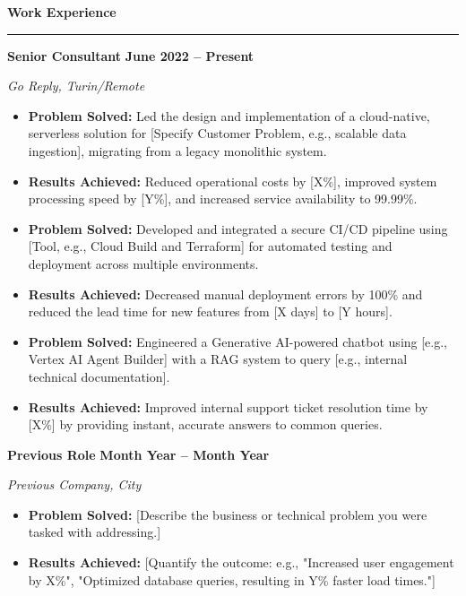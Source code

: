 \documentclass[9pt, a4paper]{article}
\newcommand{\cvsection}[1]{%
  \vspace{8pt} %
  \par %
  {\Large\bfseries\color{sectionblue}#1} %
  \par %
  \vspace{2pt} %
  \hrule %
  \vspace{6pt} %
}
\newcommand{\cvsubsection}[3]{%
  \par %
  {\large\bfseries #1} %
  \hfill %
  {\bfseries #2} %
  \par %
  {\textit{#3}} %
  \vspace{4pt} %
}
\begin{document}
\begin{minipage}[t]{0.70\textwidth}

\cvsection{Work Experience}

\cvsubsection
  {Senior Consultant} %
  {June 2022 -- Present} %
  {Go Reply, Turin/Remote} %

\begin{itemize}[leftmargin=*, nosep]
    \item \textbf{Problem Solved:} Led the design and implementation of a cloud-native, serverless solution for [Specify Customer Problem, e.g., scalable data ingestion], migrating from a legacy monolithic system.
    \item \textbf{Results Achieved:} Reduced operational costs by [X\%], improved system processing speed by [Y\%], and increased service availability to 99.99\%.
    \item \textbf{Problem Solved:} Developed and integrated a secure CI/CD pipeline using [Tool, e.g., Cloud Build and Terraform] for automated testing and deployment across multiple environments.
    \item \textbf{Results Achieved:} Decreased manual deployment errors by 100\% and reduced the lead time for new features from [X days] to [Y hours].
    \item \textbf{Problem Solved:} Engineered a Generative AI-powered chatbot using [e.g., Vertex AI Agent Builder] with a RAG system to query [e.g., internal technical documentation].
    \item \textbf{Results Achieved:} Improved internal support ticket resolution time by [X\%] by providing instant, accurate answers to common queries.
\end{itemize}

\vspace{6pt} %
\cvsubsection
  {Previous Role} %
  {Month Year -- Month Year} %
  {Previous Company, City} %

\begin{itemize}[leftmargin=*, nosep]
    \item \textbf{Problem Solved:} [Describe the business or technical problem you were tasked with addressing.]
    \item \textbf{Results Achieved:} [Quantify the outcome: e.g., "Increased user engagement by X\%", "Optimized database queries, resulting in Y\% faster load times."]
\end{itemize}


\end{minipage}
\end{document}
